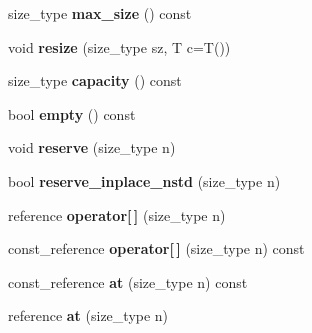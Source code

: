 \begin{DoxyCompactItemize}
\item 
\hypertarget{classyasli_1_1vector_a14fb00f97b3fbe11acd87bea3291c542}{}size\+\_\+type {\bfseries max\+\_\+size} () const \label{classyasli_1_1vector_a14fb00f97b3fbe11acd87bea3291c542}

\item 
\hypertarget{classyasli_1_1vector_a5b4e67db5f28ffcb0e0dd080fe8d70ce}{}void {\bfseries resize} (size\+\_\+type sz, T c=T())\label{classyasli_1_1vector_a5b4e67db5f28ffcb0e0dd080fe8d70ce}

\item 
\hypertarget{classyasli_1_1vector_acb09db9381feb2b855aa2da3542902ce}{}size\+\_\+type {\bfseries capacity} () const \label{classyasli_1_1vector_acb09db9381feb2b855aa2da3542902ce}

\item 
\hypertarget{classyasli_1_1vector_ae32fc59d8f3e959543182340abebf212}{}bool {\bfseries empty} () const \label{classyasli_1_1vector_ae32fc59d8f3e959543182340abebf212}

\item 
\hypertarget{classyasli_1_1vector_a0648bd95e161313ef04a69b89ff5e568}{}void {\bfseries reserve} (size\+\_\+type n)\label{classyasli_1_1vector_a0648bd95e161313ef04a69b89ff5e568}

\item 
\hypertarget{classyasli_1_1vector_a6133860c534eefb8c479bb7bcc835197}{}bool {\bfseries reserve\+\_\+inplace\+\_\+nstd} (size\+\_\+type n)\label{classyasli_1_1vector_a6133860c534eefb8c479bb7bcc835197}

\item 
\hypertarget{classyasli_1_1vector_afaaaf997b75f7d377dd101bcb01f93e9}{}reference {\bfseries operator\mbox{[}$\,$\mbox{]}} (size\+\_\+type n)\label{classyasli_1_1vector_afaaaf997b75f7d377dd101bcb01f93e9}

\item 
\hypertarget{classyasli_1_1vector_aa5d70773a443e344a36ba132acd8759d}{}const\+\_\+reference {\bfseries operator\mbox{[}$\,$\mbox{]}} (size\+\_\+type n) const \label{classyasli_1_1vector_aa5d70773a443e344a36ba132acd8759d}

\item 
\hypertarget{classyasli_1_1vector_a041238b4e3c0530ea30face168808707}{}const\+\_\+reference {\bfseries at} (size\+\_\+type n) const \label{classyasli_1_1vector_a041238b4e3c0530ea30face168808707}

\item 
\hypertarget{classyasli_1_1vector_ac90d18af6ba49424727a2b5152caf526}{}reference {\bfseries at} (size\+\_\+type n)\label{classyasli_1_1vector_ac90d18af6ba49424727a2b5152caf526}


\end{DoxyCompactItemize}
